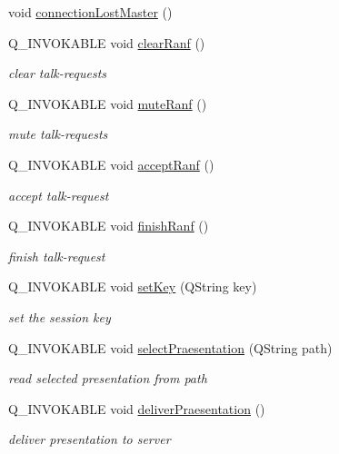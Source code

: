 \begin{DoxyCompactItemize}
void \hyperlink{class_master_client_aa739843ae87d6df0456755e9efb75638}{connection\+Lost\+Master} ()
\item 
Q\+\_\+\+I\+N\+V\+O\+K\+A\+B\+L\+E void \hyperlink{class_master_client_a737e3f2476947fe17df76f584d54c3e7}{clear\+Ranf} ()
\begin{DoxyCompactList}\small\item\em clear talk-\/requests \end{DoxyCompactList}\item 
Q\+\_\+\+I\+N\+V\+O\+K\+A\+B\+L\+E void \hyperlink{class_master_client_a8f8a33a659c751b62502936903b550b1}{mute\+Ranf} ()
\begin{DoxyCompactList}\small\item\em mute talk-\/requests \end{DoxyCompactList}\item 
Q\+\_\+\+I\+N\+V\+O\+K\+A\+B\+L\+E void \hyperlink{class_master_client_a96ee9d9e5beb8d71dc5e0da949649f23}{accept\+Ranf} ()
\begin{DoxyCompactList}\small\item\em accept talk-\/request \end{DoxyCompactList}\item 
Q\+\_\+\+I\+N\+V\+O\+K\+A\+B\+L\+E void \hyperlink{class_master_client_a410703b6a8e35cde05d2d6096baf981a}{finish\+Ranf} ()
\begin{DoxyCompactList}\small\item\em finish talk-\/request \end{DoxyCompactList}\item 
Q\+\_\+\+I\+N\+V\+O\+K\+A\+B\+L\+E void \hyperlink{class_master_client_aaac66be279a2f4ec80db6514e8701cf5}{set\+Key} (Q\+String key)
\begin{DoxyCompactList}\small\item\em set the session key \end{DoxyCompactList}\item 
Q\+\_\+\+I\+N\+V\+O\+K\+A\+B\+L\+E void \hyperlink{class_master_client_a2dd317bef7babb2e7a1a6babf3eccfc8}{select\+Praesentation} (Q\+String path)
\begin{DoxyCompactList}\small\item\em read selected presentation from path \end{DoxyCompactList}\item 
Q\+\_\+\+I\+N\+V\+O\+K\+A\+B\+L\+E void \hyperlink{class_master_client_a3cfe1cc8dd262134b5e6b6a73aff2af4}{deliver\+Praesentation} ()
\begin{DoxyCompactList}\small\item\em deliver presentation to server \end{DoxyCompactList}\item 

\end{DoxyCompactItemize}
